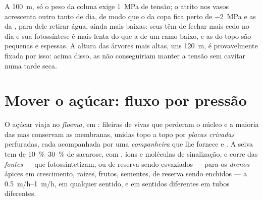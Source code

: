 \begin{example}\label{ex:b1:plant-transport:top}
A \qty{100}{m}, só o peso da coluna exige \qty{1}{MPa} de tensão; o
atrito nos vasos acrescenta outro tanto de dia, de modo que o 
da copa fica perto de \qty{-2}{MPa} e as  da , para dele
retirar água, ainda mais baixas: seus  têm de fechar mais
cedo no dia e sua fotossíntese é mais lenta do que a de um ramo baixo,
e as  do topo são pequenas e espessas. A altura das árvores mais
altas, uns \qty{120}{m}, é provavelmente fixada por isso: acima disso,
as  não conseguiriam manter a tensão sem cavitar numa tarde
seca.
\end{example}

\section{Mover o açúcar: fluxo por pressão}

\begin{definition}\label{def:b1:plant-transport:phloem}
O açúcar viaja no \emph{floema}, em \emph{}: fileiras de
 vivas que perderam o núcleo e a maioria das  mas
conservam as membranas, unidas topo a topo por \emph{placas crivadas}
perfuradas, cada  acompanhada por uma \emph{ companheira}
que lhe fornece  e . A seiva tem de \qtyrange{10}{30}{\%}
de sacarose, com , íons e moléculas de sinalização, e corre
das \emph{fontes} ---  que fotossintetizam, ou  de reserva
sendo esvaziados --- para os \emph{drenos} --- ápices em crescimento,
raízes, frutos, sementes,  de reserva sendo enchidos --- a
\qtyrange{0.5}{1}{m/h}, em qualquer sentido, e em sentidos diferentes
em tubos diferentes.
\end{definition}

